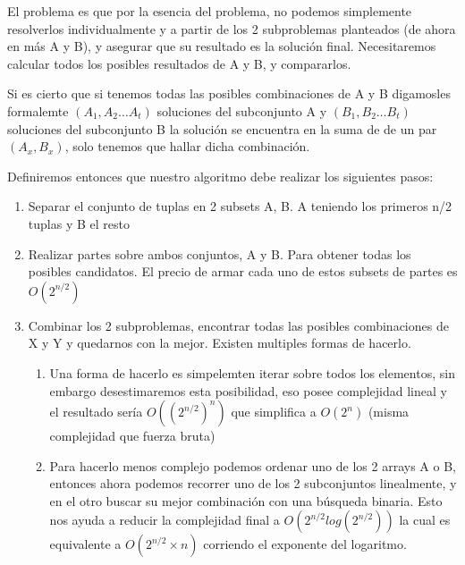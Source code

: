 \documentclass[fleqn, 11pt]{article}
\begin{document}
El problema es que por la esencia del problema, no podemos simplemente
resolverlos individualmente y a partir de los 2 subproblemas planteados (de
ahora en más A y B), y asegurar que su resultado es la solución final.
Necesitaremos calcular todos los posibles resultados de A y B, y compararlos.

Si es cierto que si tenemos todas las posibles combinaciones de A y B
digamosles formalemte $(A_1,A_2 \dots A_t)$ soluciones del subconjunto A y
$(B_1,B_2 \dots B_t)$ soluciones del subconjunto B  la solución se encuentra en
la suma de de un par $(A_x,B_x)$, solo tenemos que hallar dicha combinación.

Definiremos entonces que nuestro algoritmo debe realizar los siguientes pasos:

\begin{enumerate}
\item Separar el conjunto de tuplas en 2 subsets A, B. A teniendo los primeros
n/2 tuplas y B el resto

\item Realizar partes sobre ambos conjuntos, A y B. Para obtener todas los
posibles candidatos. El precio de armar cada uno de estos subsets de partes es
$O(2^{n/2})$

\item Combinar los 2 subproblemas, encontrar todas las posibles combinaciones
de X y Y y quedarnos con la mejor. Existen multiples formas de hacerlo.

\begin{enumerate}
	\item Una forma de hacerlo es simpelemten iterar sobre todos los
	elementos, sin embargo desestimaremos esta posibilidad, eso posee
	complejidad lineal y el resultado sería $O((2^{n/2})^n)$ que simplifica
	a $O(2^n)$ (misma complejidad que fuerza bruta)

	\item Para hacerlo menos complejo podemos ordenar uno de los 2 arrays A
	o B, entonces ahora podemos recorrer uno de los 2 subconjuntos
	linealmente, y en el otro buscar su mejor combinación con una búsqueda
	binaria. Esto nos ayuda a reducir la complejidad final a
	$O(2^{n/2}log(2^{n/2}))$ la cual es equivalente a $O(2^{n/2}\times n)$
	corriendo el exponente del logaritmo.
\end{enumerate}
\end{enumerate}
\end{document}
